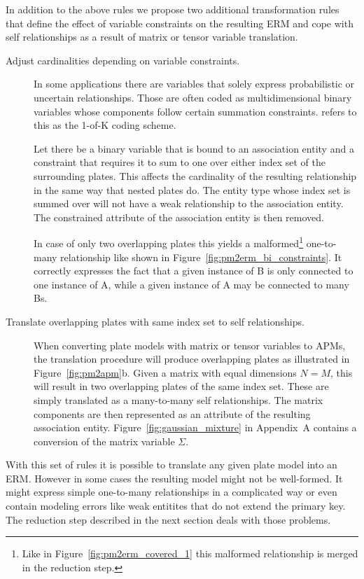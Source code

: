 In addition to the above rules we propose two additional transformation rules that define the effect of variable constraints on the resulting ERM and cope with self relationships as a result of matrix or tensor variable translation.

\begin{description}
\item[Adjust cardinalities depending on variable constraints.] In some applications there are variables that solely express probabilistic or uncertain relationships. Those are often coded as multidimensional binary variables whose components follow certain summation constraints. \textcite{bishop2006pattern} refers to this as the 1-of-K coding scheme.

Let there be a binary variable that is bound to an association entity and a constraint that requires it to sum to one over either index set of the surrounding plates. This affects the cardinality of the resulting relationship in the same way that nested plates do. The entity type whose index set is summed over will not have a weak relationship to the association entity. The constrained attribute of the association entity is then removed.

In case of only two overlapping plates this yields a malformed\footnote{Like in Figure~\ref{fig:pm2erm_covered_1} this malformed relationship is merged in the reduction step.} one-to-many relationship like shown in Figure~\ref{fig:pm2erm_bi_constraints}. It correctly expresses the fact that a given instance of B is only connected to one instance of A, while a given instance of A may be connected to many Bs.

\item[Translate overlapping plates with same index set to self relationships.] When converting plate models with matrix or tensor variables to APMs, the translation procedure will produce overlapping plates as illustrated in Figure~\ref{fig:pm2apm}b. Given a matrix with equal dimensions $N = M$, this will result in two overlapping plates of the same index set. These are simply translated as a many-to-many self relationships. The matrix components are then represented as an attribute of the resulting association entity. Figure~\ref{fig:gaussian_mixture} in Appendix~A contains a conversion of the matrix variable $\Sigma$.
\end{description}

With this set of rules it is possible to translate any given plate model into an ERM. However in some cases the resulting model might not be well-formed. It might express simple one-to-many relationships in a complicated way or even contain modeling errors like weak entitites that do not extend the primary key. The reduction step described in the next section deals with those problems.


